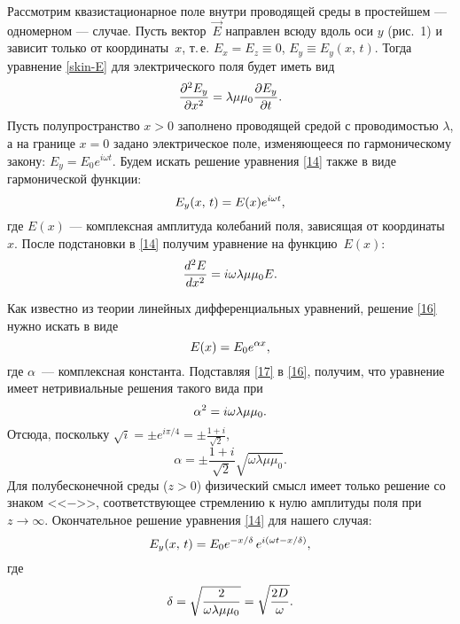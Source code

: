 


\label{sec:skin}

Рассмотрим квазистационарное поле внутри проводящей среды в простейшем --- одномерном --- случае.
Пусть вектор~$\vec{E}$ направлен всюду вдоль оси $y$ (рис.~1) и зависит 
только от координаты~$x$, т.\,е. $E_x=E_z\equiv 0$, $E_y\equiv E_y(x,\,t)$. 
Тогда уравнение \eqref{skin-E} для электрического поля будет иметь вид
\begin{equation} \eqmark{14}
\frac{\partial^2E_y}{\partial x^2}= \lambda \mu \mu_0 \ddt{E_y}.
\end{equation}
Пусть полупространство $x>0$ заполнено проводящей средой с проводимостью $\lambda$, 
а на границе $x=0$ задано электрическое поле, изменяющееся по гармоническому закону: 
$E_y=E_0e^{i\omega t}$. Будем
искать решение уравнения \eqref{14} также в виде гармонической функции:
\begin{equation*} \eqmark{15}
E_y(x,\,t)=E(x)e^{i\omega t},
\end{equation*}
где $E(x)$ --- комплексная амплитуда колебаний поля, зависящая от координаты~$x$.
После подстановки в \eqref{14} получим уравнение на функцию~$E(x)$:
\begin{equation} \eqmark{16}
\frac{d^2E}{dx^2}=i\omega\lambda\mu\mu_0 E.
\end{equation}

Как известно из теории линейных дифференциальных уравнений, решение
\eqref{16} нужно искать в виде 
\begin{equation} \eqmark{17}
E(x)=E_0 e^{\alpha x},
\end{equation}
где $\alpha$~--- комплексная константа. 
Подставляя \eqref{17} в \eqref{16}, получим, что уравнение имеет
нетривиальные решения такого вида при
\begin{equation} \eqmark{18}
\alpha^2=i\omega\lambda\mu\mu_0.
\end{equation}
Отсюда, поскольку $\sqrt{i} = \pm e^{i\pi/4}  = \pm \frac{1+i}{\sqrt{2}}$,
\begin{equation*}
\alpha=\pm\frac{1+i}{\sqrt{2}}\sqrt{\omega\lambda\mu\mu_0}.
\end{equation*}
Для полубесконечной среды ($z>0$) физический смысл имеет только решение
со знаком <<$-$>>, соответствующее стремлению к нулю амплитуды поля 
при $z\to \infty$. 
Окончательное решение уравнения \eqref{14} для нашего случая:
\begin{equation} \eqmark{19}
E_y(x,\,t)=E_0e^{-x/\delta}\,e^{i(\omega t- x/\delta)},
\end{equation}
где
\begin{equation} \eqmark{20}
\delta = \sqrt{\frac{2}{\omega\lambda\mu\mu_0}} = \sqrt{\frac{2D}{\omega}}.
\end{equation}

